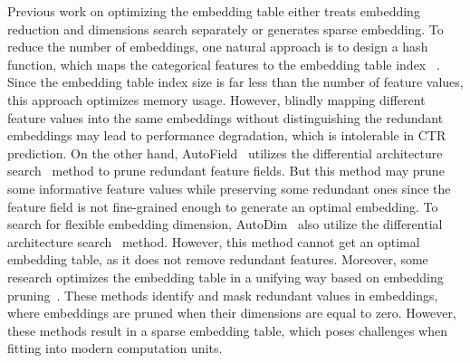 \documentclass[sigconf]{acmart}
\begin{document}
Previous work on optimizing the embedding table either treats embedding reduction and dimensions search separately or generates sparse embedding. To reduce the number of embeddings, one natural approach is to design a hash function, which maps the categorical features to the embedding table index ~\cite{featurehashing, doublehashing, binarycode}. Since the embedding table index size is far less than the number of feature values, this approach optimizes memory usage. However, blindly mapping different feature values into the same embeddings without distinguishing the redundant embeddings may lead to performance degradation, which is intolerable in CTR prediction. On the other hand, AutoField~\cite{autofield} utilizes the differential architecture search~\cite{DARTS} method to prune redundant feature fields. But this method may prune some informative feature values while preserving some redundant ones since the feature field is not fine-grained enough to generate an optimal embedding. 
To search for flexible embedding dimension, AutoDim~\cite{AutoDim} also utilize the differential architecture search~\cite{DARTS} method. However, this method cannot get an optimal embedding table, as it does not remove redundant features. 
Moreover, some research optimizes the embedding table in a unifying way based on embedding pruning~\cite{PEP,UMEC,single-shot}. These methods identify and mask redundant values in embeddings, where embeddings are pruned when their dimensions are equal to zero. However, these methods result in a sparse embedding table, which poses challenges when fitting into modern computation units.
\end{document}
